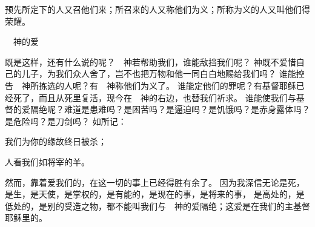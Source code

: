 {预先所定下的人又召他们来；所召来的人又称他们为义；所称为义的人又叫他们得荣耀。
\par }{\SH 　神的爱
\par }{\PP {}既是这样，还有什么说的呢？　神若帮助我们，谁能敌挡我们呢？
神既不爱惜自己的儿子，为我们众人舍了，岂不也把万物和他一同白白地赐给我们吗？
谁能控告　神所拣选的人呢？有　神称他们为义了。
谁能定他们的罪呢？有基督耶稣已经死了，而且从死里复活，现今在　神的右边，也替我们祈求。
谁能使我们与基督的爱隔绝呢？难道是患难吗？是困苦吗？是逼迫吗？是饥饿吗？是赤身露体吗？是危险吗？是刀剑吗？
如{}所记：
\par }{\Q 我们为你的缘故终日被杀；
\par }{\Q 人看我们如将宰的羊。
\par }{\PP {}然而，靠着爱我们的{}，在这一切的事上已经得胜有余了。
因为我深信无论是死，是生，是天使，是掌权的，是有能的，是现在的事，是将来的事，
是高处的，是低处的，是别的受造之物，都不能叫我们与　神的爱隔绝；这爱是在我们的主基督耶稣里的。

}
